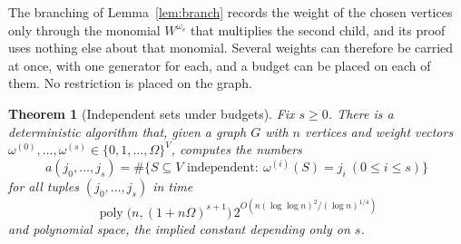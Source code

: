 \documentclass[11pt,reqno]{amsart}
\numberwithin{equation}{section}
\theoremstyle{plain}
\newtheorem{theorem}{Theorem}[section]
\theoremstyle{definition}
\theoremstyle{remark}
\DeclareMathOperator{\poly}{poly}
\begin{document}
The branching of Lemma~\ref{lem:branch} records the weight of the chosen
vertices only through the monomial $W^{\omega_v}$ that multiplies the second
child, and its proof uses nothing else about that monomial. Several weights can
therefore be carried at once, with one generator for each, and a budget can be
placed on each of them. No restriction is placed on the graph.

\begin{theorem}[Independent sets under budgets]\label{thm:indepbudget}
Fix $s\ge0$. There is a deterministic algorithm that, given a graph $G$ with $n$
vertices and weight vectors $\omega^{(0)},\dots,\omega^{(s)}\in\{0,1,\dots,\Omega\}^{V}$,
computes the numbers
\[
  a(j_0,\dots,j_s)=\#\bigl\{S\subseteq V\text{ independent}:\ \omega^{(i)}(S)=j_i\ (0\le i\le s)\bigr\}
\]
for all tuples $(j_0,\dots,j_s)$ in time
\[
  \poly\bigl(n,(1+n\Omega)^{s+1}\bigr)\,2^{O(n(\log\log n)^2/(\log n)^{1/4})}
\]
and polynomial space, the implied constant depending only on $s$.
\end{theorem}
\end{document}
